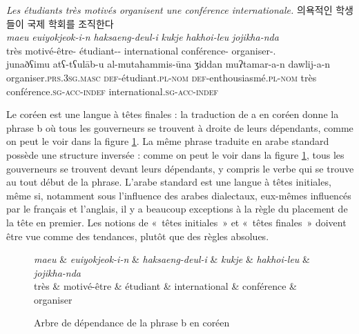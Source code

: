 {\ea \label{ex:motives}
    \ea \textit{{Les étudiants très motivés organisent une conférence internationale.}} 
    \ex {}  {\cjkfont 의욕적인}  {\cjkfont 학생들이}  {\cjkfont 국제}  {\cjkfont 학회를}   {\cjkfont 조직한다}\\
         \textit{maeu}  \textit{euiyokjeok-i-n}  \textit{haksaeng-deul-i}  \textit{kukje}  \textit{hakhoi-leu}   \textit{jojikha-nda}\\
         très   {motivé-être-\Q}   {étudiant-\PL-\NOM}  international  {conférence-\ACC}  organiser-\IND.\PRS\\
    \ex \gll junaðʕimu  atʕ-tʕul\=ab-u al-mutaħammis-\=una ʒiddan muʔtamar-a-n  dawlij-a-n\\
    organiser.\textsc{prs.3sg.masc} \textsc{def}-étudiant.\textsc{pl-nom} \textsc{def}-enthousiasmé.\textsc{pl-nom}  très conférence.\textsc{sg-acc-indef}  international.\textsc{sg-acc-indef}\\
  \z
\z
    
    Le coréen est une langue à têtes finales : la traduction de a en coréen donne la phrase b où tous les gouverneurs se trouvent à droite de leurs dépendants, comme on peut le voir dans la figure \ref{fig:motives-coreen}. La même phrase traduite en arabe standard possède une structure inversée : comme on peut le voir dans la figure \ref{fig:motives-coreen}, tous les gouverneurs se trouvent devant leurs dépendants, y compris le verbe qui se trouve au tout début de la phrase. L’arabe standard est une langue à têtes initiales, même si, notamment sous l'influence des arabes dialectaux, eux-mêmes influencés par le français et l'anglais, il y a beaucoup exceptions à la règle du placement de la tête en premier. Les notions de «~têtes initiales~» et «~têtes finales~» doivent être vue comme des tendances, plutôt que des règles absolues.

   
\begin{figure}[H]
    \caption{Arbre de dépendance de la phrase b en coréen\label{fig:motives-coreen}}
    \begin{dependency}[font=\footnotesize,arc edge, arc angle=80, text only label, label style={above}]
    \begin{deptext}
    \textit{maeu}  \& \textit{euiyokjeok-i-n} \& \textit{haksaeng-deul-i} \& \textit{kukje} \& \textit{hakhoi-leu} \& \textit{jojikha-nda}\\
    très  \& {motivé-être}  \& étudiant   \& international \& conférence \& organiser\\
    \end{deptext}
    \end{dependency}
\end{figure}

}
